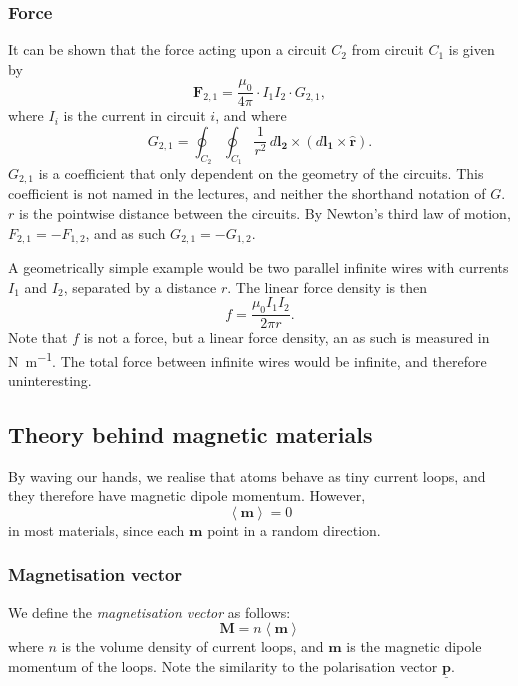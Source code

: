 \documentclass[a4paper, 12pt]{article}
\renewcommand{\vec}[1]{\mathbf{#1}}
\newcommand{\p}{\ensuremath{\vec{\underline{p}}}}
\let\tmp\hat
\renewcommand{\hat}[1]{\vec{\tmp{#1}}}
\begin{document}
        \subsubsection{Force}
            It can be shown that the force acting upon a circuit $C_2$ from circuit $C_1$ is given by
            \begin{equation}
                \vec{F}_{2,1} = \frac{\mu_0}{4\pi}\cdot I_1 I_2 \cdot G_{2,1},
            \end{equation}
            where $I_i$ is the current in circuit $i$, and where 
            \begin{equation}
                G_{2,1} = \oint_{C_2} \oint_{C_1} \frac{1}{r^2}\,d\vec{l_2}\times\left(d\vec{l_1} \times \hat{r}\right).
            \end{equation}
            $G_{2,1}$ is a coefficient that only dependent on the geometry of the circuits. 
            This coefficient is not named in the lectures, and neither the shorthand notation of $G$.
            $r$ is the pointwise distance between the circuits. By Newton's third law of motion, 
            $F_{2,1} = -F_{1,2}$, and as such $G_{2,1} = - G_{1,2}$.

            A geometrically simple example would be two parallel infinite wires with currents $I_1$ and $I_2$, 
            separated by a distance $r$. The linear force density is then
            \begin{equation}
                f = \frac{\mu_0 I_1 I_2}{2\pi r}.
            \end{equation}
            Note that $f$ is not a force, but a linear force density, an as such is measured in \si{\newton\per\metre}. 
            The total force between infinite wires would be infinite, and therefore uninteresting.

    \subsection{Theory behind magnetic materials}
        By waving our hands, we realise that atoms behave as tiny current loops, and they therefore have magnetic dipole momentum.
        However, 
        \begin{equation*}
            \left<\vec{m}\right> = 0
        \end{equation*}
        in most materials, since each $\vec{m}$ point in a random direction. 

        \subsubsection{Magnetisation vector}
            We define the \textit{magnetisation vector} as follows:
            \begin{equation}
                \vec{M} = n\left<\vec{m}\right>
            \end{equation}
            where $n$ is the volume density of current loops, and $\vec{m}$ is the magnetic dipole momentum of the loops. 
            Note the similarity to the polarisation vector $\p$.
\end{document}
